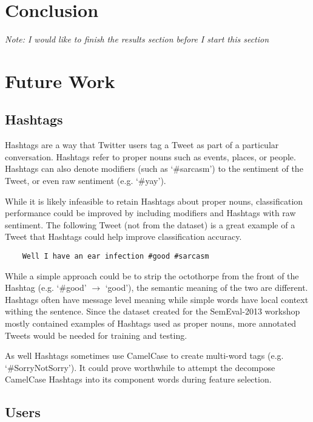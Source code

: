 \documentclass[12pt]{article}
\begin{document}
\section{Conclusion}

\textit{Note: I would like to finish the results section before I start this section }


\section{Future Work}

\subsection{Hashtags}

Hashtags are a way that Twitter users tag a Tweet as part of a particular
conversation. Hashtags refer to proper nouns such as events, places, or people.
Hashtags can also denote modifiers (such as `\#sarcasm') to the sentiment of the
Tweet, or even raw sentiment (e.g. `\#yay').

While it is likely infeasible to retain Hashtags about proper nouns,
classification performance could be improved by including modifiers and
Hashtags with raw sentiment. The following Tweet (not from the dataset) is a
great example of a Tweet that Hashtags could help improve classification
accuracy.

\begin{verbatim}
    Well I have an ear infection #good #sarcasm
\end{verbatim}

While a simple approach could be to strip the octothorpe from the front of the
Hashtag (e.g. `\#good' $\rightarrow$ `good'), the semantic meaning of the two
are different. Hashtags often have message level meaning while simple words
have local context withing the sentence. Since the dataset created for the
SemEval-2013 workshop mostly contained examples of Hashtags used as proper
nouns, more annotated Tweets would be needed for training and testing.

As well Hashtags sometimes use CamelCase to create multi-word tags (e.g.
`\#SorryNotSorry'). It could prove worthwhile to attempt the decompose
CamelCase Hashtags into its component words during feature selection.

\subsection{Users}
\end{document}
